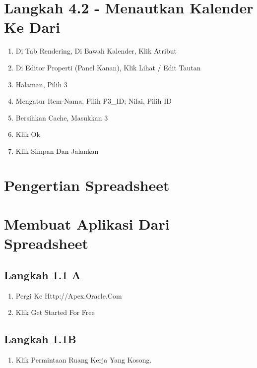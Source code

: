 \documentclass{article}
\begin{document}
\section{Langkah 4.2 - Menautkan Kalender Ke Dari}
\begin{enumerate}
    \item Di Tab Rendering, Di Bawah Kalender, Klik Atribut
\item Di Editor Properti (Panel Kanan), Klik Lihat / Edit Tautan
\item Halaman, Pilih 3
\item Mengatur Item-Nama, Pilih P3_ID; Nilai, Pilih ID
\item Bersihkan Cache, Masukkan 3
\item Klik Ok
\item Klik Simpan Dan Jalankan


\end{enumerate}

\section{Pengertian Spreadsheet}
\usepackage{Spreadsheet: Memungkinkan Pengguna Untuk Menyimpan Berbagai Informasi Yang Sangat Lengkap, Pada Setiap Kolomnya Bisa Menyimpan Berbagai Data Informasi Yang Berbeda Dari Informasi Yang Di Perlukan.App From Spreadsheet Disini Berupa Beberapa Project Dan Nama Tugas Nya Serta Keterangan Lainnya Seperti Tanggal Mulai, Tanggal Selesai, Status, Di Ttd Oleh,Biaya, Budget Tersedia, Dan Lebih Kurangnya Dari Budget.}

\section{Membuat Aplikasi Dari Spreadsheet}
\subsection{Langkah 1.1 A}
\begin{enumerate}
    \item Pergi Ke Http://Apex.Oracle.Com
    \item Klik Get Started For Free

\end{enumerate}
\subsection{Langkah 1.1B}
\begin{enumerate}
    \item Klik Permintaan Ruang Kerja Yang Kosong.
\end{enumerate}
\end{document}
